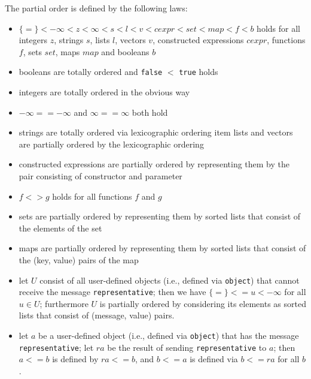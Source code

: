 \documentclass[11pt]{amsart}
\newcommand{\babelsrc}[1] {\lstinline!#1!}
\begin{document}
The partial order is defined by the following laws:
\begin{itemize}
\item  $\{=\} < -\infty <  z  < \infty < s <  l < v < cexpr < set < map <  f < b$ holds for all
 integers $z$, strings $s$,  lists $l$,  vectors $v$, constructed expressions $cexpr$, functions $f$, sets $set$, maps $map$ and booleans $b$
 \item booleans are totally ordered and \babelsrc{false} $<$ \babelsrc{true} holds
 \item integers are totally ordered in the obvious way
 \item $-\infty == -\infty$ and $\infty == \infty$ both hold 
 \item strings are totally ordered via lexicographic ordering
 item lists and vectors are partially ordered by the lexicographic ordering 
\item constructed expressions are partially ordered by representing them by the pair consisting of constructor and parameter
\item $f <> g$ holds for all functions $f$ and $g$
\item sets are partially ordered by representing them by sorted lists that consist of the elements of the set
\item maps are partially ordered by representing them by sorted lists that consist of the (key, value) pairs of the map
\item let $U$ consist of all user-defined objects  (i.e., defined via \babelsrc{object}) that cannot receive the message \texttt{representative}; then we have  $\{=\} <= u < -\infty$  for all $u \in U$; furthermore $U$ is partially ordered by considering its elements as sorted lists that consist of (message, value) pairs.
\item let $a$ be a user-defined object  (i.e., defined via \babelsrc{object}) that has the message \texttt{representative}; let $ra$ be the result of sending  \texttt{representative} to $a$; then $a <= b$ is defined by $ra <= b$, and $b <= a$ is defined via $b <= ra$ for all $b$.
\end{itemize}
\end{document}
